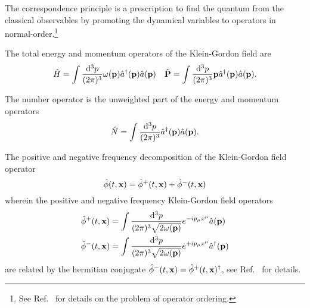 \begin{definition}
	The correspondence principle is a prescription to find the quantum from the classical observables by promoting the dynamical variables to operators in normal-order.\footnote{See Ref.~\cite[p.~20]{Mukhanov2007} for details on the problem of operator ordering.}
\end{definition}
\begin{corollary}
	The total energy and momentum operators of the Klein-Gordon field are
	\begin{align}
		\hat{H}
		=
		\int\frac{\dd[3]{p}}{(2\pi)^3}
		\omega(\vb{p})\hat{a}^\dagger(\vb{p})\hat{a}(\vb{p})
		&&
		\hat{\vb{P}}
		=
		\int\frac{\dd[3]{p}}{(2\pi)^3}
		\vb{p}\hat{a}^\dagger(\vb{p})\hat{a}(\vb{p})
		\label{eq:qkg_energy_momentum}
		.
	\end{align}
\end{corollary}
\begin{corollary}
	The number operator is the unweighted part of the energy and momentum operators
	\begin{equation}
		\hat{N}
		=
		\int\frac{\dd[3]{p}}{(2\pi)^3}
		\hat{a}^\dagger(\vb{p})
		\hat{a}(\vb{p})
		\label{eq:qkg_number}
		.
	\end{equation}
\end{corollary}
\begin{definition}
	The positive and negative frequency decomposition of the Klein-Gordon field operator
	\begin{equation}
		\hat\phi(t,\vb{x})
		=
		\hat\phi^+(t,\vb{x})
		+
		\hat\phi^-(t,\vb{x})
	\end{equation}
	wherein the positive and negative frequency Klein-Gordon field operators
	\begin{equation}
		\begin{split}
			\hat\phi^+(t,\vb{x})
			&=
			\int\frac{\dd[3]{p}}{(2\pi)^3\sqrt{2\omega(\vb{p})}}
			e^{-ip_\mu x^\mu}
			\hat{a}(\vb{p})
			\\
			\hat\phi^-(t,\vb{x})
			&=
			\int\frac{\dd[3]{p}}{(2\pi)^3\sqrt{2\omega(\vb{p})}}
			e^{+ip_\mu x^\mu}
			\hat{a}^\dagger(\vb{p})
		\end{split}
		\label{eq:qkg_positive_negative_frequency}
	\end{equation}
	are related by the hermitian conjugate $\hat\phi^-(t,\vb{x})=\hat\phi^+(t,\vb{x})^\dagger$, see Ref.~\cite[p.~26]{Peskin1995} for details.
\end{definition}

